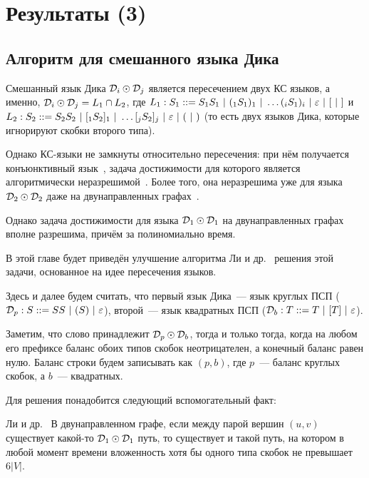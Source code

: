\section{Результаты (3)}\label{section:dyck_1_1}

\subsection{Алгоритм для смешанного языка Дика}

Смешанный язык Дика $\mathcal{D}_i \odot \mathcal{D}_j$ является пересечением двух КС языков, а именно, $\mathcal{D}_i \odot \mathcal{D}_j = L_1 \cap L_2$, где $L_1 : S_1 ::= S_1 S_1~|~(_1 S_1 )_1~|~ \dots (_i S_1 )_i ~|~ \varepsilon ~|~ [ ~|~ ]$ и $L_2 : S_2 ::= S_2 S_2~|~[_1 S_2 ]_1~|~ \dots [_j S_2 ]_j ~|~ \varepsilon ~|~ ( ~|~ )$ (то есть двух языков Дика, которые игнорируют скобки второго типа). 

Однако КС-языки не замкнуты относительно пересечения: при нём получается конъюнктивный язык~\cite{Okhotin01}, задача достижимости для которого является алгоритмически неразрешимой~\cite{Hellings14}. Более того, она неразрешима уже для языка $\mathcal{D}_2 \odot \mathcal{D}_2$ даже на двунаправленных графах~\cite{Li21}. 

Однако задача достижимости для языка $\mathcal{D}_1 \odot \mathcal{D}_1$ на двунаправленных графах вполне разрешима, причём за полиномиально время.

В этой главе будет приведён улучшение алгоритма Ли и др.~\cite{Li21} решения этой задачи, основанное на идее пересечения языков.

\begin{note}\label{fact:intersection}

  Здесь и далее будем считать, что первый язык Дика~--- язык круглых ПСП ($\mathcal{D}_p : S ::= SS~|~(S)~|~\varepsilon$), второй~--- язык квадратных ПСП ($\mathcal{D}_b : T ::= T~|~[T]~|~\varepsilon$).
\end{note}

Заметим, что слово принадлежит $\mathcal{D}_p \odot \mathcal{D}_b$, тогда и только тогда, когда на любом его префиксе баланс обоих типов скобок неотрицателен, а конечный баланс равен нулю. Баланс строки будем записывать как $(p, b)$, где $p$~--- баланс круглых скобок, а $b$~--- квадратных.

Для решения понадобится следующий вспомогательный факт:

\begin{lemma}{Ли и др.~\cite{Li21}}\label{lm:dyck_6v}
  В двунаправленном графе, если между парой вершин $(u, v)$ существует какой-то $\mathcal{D}_1 \odot \mathcal{D}_1$ путь, то существует и такой путь, на котором в любой момент времени вложенность хотя бы одного типа скобок не превышает $6 |V|$.
\end{lemma}


